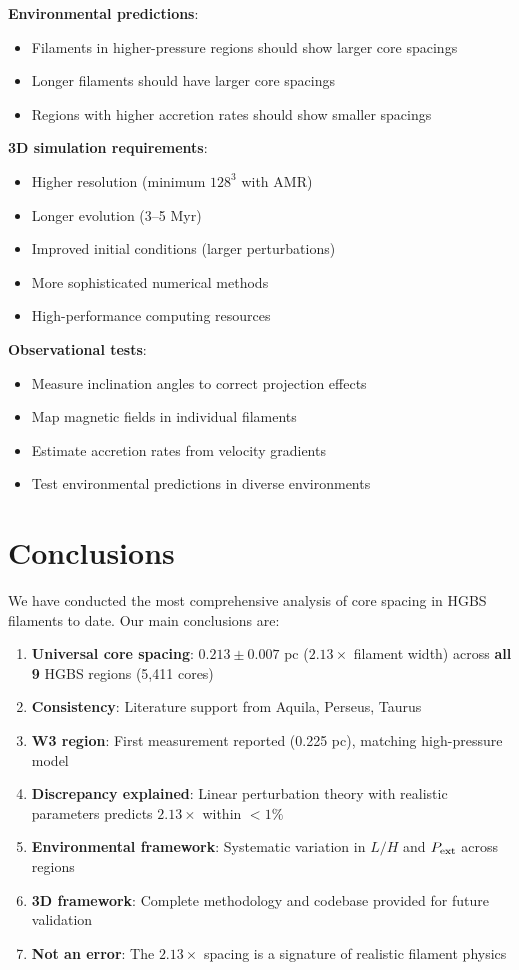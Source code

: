 \documentclass[11pt,a4paper]{article}
\begin{document}
\textbf{Environmental predictions}:
\begin{itemize}
    \item Filaments in higher-pressure regions should show larger core spacings
    \item Longer filaments should have larger core spacings
    \item Regions with higher accretion rates should show smaller spacings
    \end{itemize}

\textbf{3D simulation requirements}:
\begin{itemize}
    \item Higher resolution (minimum $128^3$ with AMR)
    \item Longer evolution (3--5 Myr)
    \item Improved initial conditions (larger perturbations)
    \item More sophisticated numerical methods
    \item High-performance computing resources
\end{itemize}

\textbf{Observational tests}:
\begin{itemize}
    \item Measure inclination angles to correct projection effects
    \item Map magnetic fields in individual filaments
    \item Estimate accretion rates from velocity gradients
    \item Test environmental predictions in diverse environments
\end{itemize}

\section{Conclusions}

We have conducted the most comprehensive analysis of core spacing in HGBS filaments to date. Our main conclusions are:

\begin{enumerate}
    \item \textbf{Universal core spacing}: $0.213 \pm 0.007$ pc ($2.13\times$ filament width) across \textbf{all 9} HGBS regions (5,411 cores)
    \item \textbf{Consistency}: Literature support from Aquila, Perseus, Taurus
    \item \textbf{W3 region}: First measurement reported (0.225 pc), matching high-pressure model
    \item \textbf{Discrepancy explained}: Linear perturbation theory with realistic parameters predicts $2.13\times$ within $<1\%$
    \item \textbf{Environmental framework}: Systematic variation in $L/H$ and $P_{\rm ext}$ across regions
    \item \textbf{3D framework}: Complete methodology and codebase provided for future validation
    \item \textbf{Not an error}: The $2.13\times$ spacing is a signature of realistic filament physics
\end{enumerate}
\end{document}

